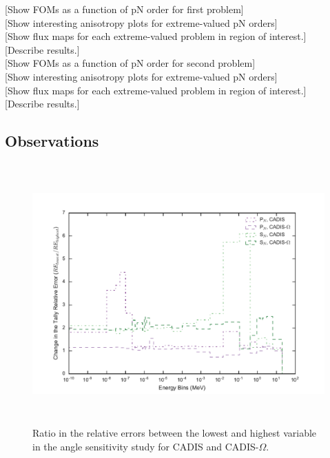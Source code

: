 [Show FOMs as a function of pN order for first problem] \\

[Show interesting anisotropy plots for extreme-valued pN orders] \\

[Show flux maps for each extreme-valued problem in region of interest.] \\

[Describe results.] \\

[Show FOMs as a function of pN order for second problem] \\

[Show interesting anisotropy plots for extreme-valued pN orders] \\

[Show flux maps for each extreme-valued problem in region of interest.] \\

[Describe results.] \\

\subsection{Observations}
\label{subsec:observations}

\begin{figure}[h!]
  \centering
  \includegraphics[height=10cm]{./chapters/characterization_probs/figures/angle/prob_1/improvement_err_allmethds.pdf}
  \caption[Ratio in the relative errors between the lowest and highest variable in the angle
  sensitivity study for CADIS and CADIS-$\Omega$.]{Ratio in the relative errors between
    the lowest and highest variable in the angle sensitivity study for CADIS and CADIS-$\Omega$.}
  \label{fig:angle_err_improvements}
\end{figure}

